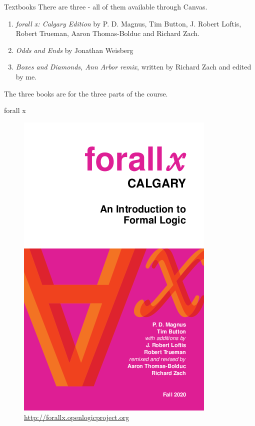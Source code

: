 \documentclass[
  ignorenonframetext,
]{beamer}
\providecommand{\tightlist}{%
  \setlength{\itemsep}{0pt}\setlength{\parskip}{0pt}}
\renewcommand{\,}{\text{, }}
\begin{document}
\begin{frame}{Textbooks}
\protect\hypertarget{textbooks}{}
There are three - all of them available through Canvas.

\begin{enumerate}
\tightlist
\item
  \emph{forall x: Calgary Edition} by P. D. Magnus, Tim Button, J.
  Robert Loftis, Robert Trueman, Aaron Thomas-Bolduc and Richard Zach.
\item
  \emph{Odds and Ends} by Jonathan Weisberg
\item
  \emph{Boxes and Diamonds, Ann Arbor remix}, written by Richard Zach
  and edited by me.
\end{enumerate}

The three books are for the three parts of the course.
\end{frame}

\begin{frame}{forall x}
\protect\hypertarget{forall-x}{}
\begin{figure}
\centering
\includegraphics[width=\textwidth,height=0.8\textheight]{../images/forallxyyc.png}
\caption{\url{http://forallx.openlogicproject.org}}
\end{figure}
\end{frame}
\end{document}
